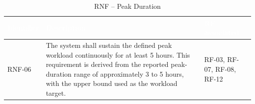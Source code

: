 \documentclass{article}
\begin{document}
\begin{table}[H]

\centering

\small

\renewcommand{\arraystretch}{1.35}

\caption{RNF -- Peak Duration}

\label{tab:rnf_peak_duration}

\begin{tabularx}{\textwidth}{|p{2.2cm}|X|p{3.5cm}|}

\hline

\rowcolor[HTML]{1F2937}

\textcolor{white}{\textbf{Identifier}} &
\textcolor{white}{\textbf{Description}} &
\textcolor{white}{\textbf{RF associated}} \\ \hline

RNF-06 &
The system shall sustain the defined peak workload continuously for at least 5 hours. This requirement is derived from the reported peak-duration range of approximately 3 to 5 hours, with the upper bound used as the workload target.
&
RF-03, RF-07, RF-08, RF-12 \\ \hline

\end{tabularx}

\end{table}


\end{document}
